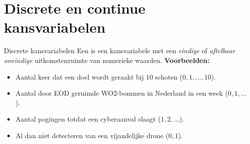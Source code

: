 \section{Discrete en continue kansvariabelen}

    \begin{frame}{Discrete kansvariabelen}
        Een  is een kansvariabele met een \emph{eindige} of \emph{aftelbaar oneindige} uitkomstenruimte van numerieke waarden.
        \vfill
        \textbf{Voorbeelden:}
        \begin{itemize}
            \item Aantal keer dat een doel wordt geraakt bij $10$ schoten ($0, 1, \ldots, 10$).
            \item Aantal door EOD geruimde WO2-bommen in Nederland in een week ($0, 1, \ldots$).
            \item Aantal pogingen totdat een cyberaanval slaagt ($1, 2, \ldots$).
            \item Al dan niet detecteren van een vijandelijke drone ($0, 1$).
        \end{itemize}

    \end{frame}

